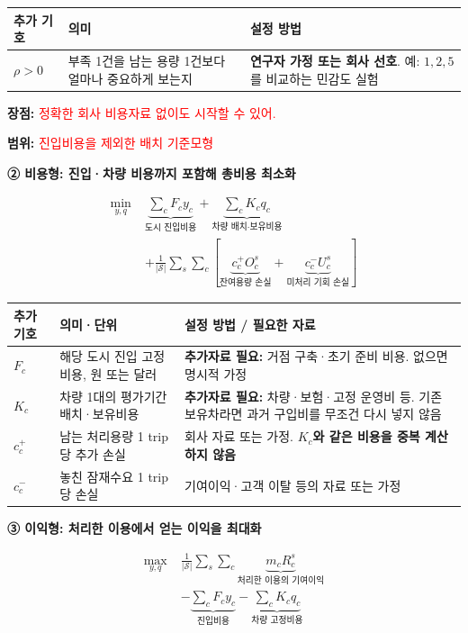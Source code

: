 \documentclass[11pt,a4paper]{article}
\newcommand{\blocktitle}[1]{\par\bigskip\noindent\textbf{\large #1}\par\smallskip}
\begin{document}
\begin{longtable}{@{}P{0.13\textwidth}P{0.38\textwidth}P{0.41\textwidth}@{}}
\toprule
추가 기호 & 의미 & 설정 방법 \\
\midrule
\endhead
$\rho>0$ & 부족 1건을 남는 용량 1건보다 얼마나 중요하게 보는지 & \textbf{연구자 가정 또는 회사 선호}. 예: $1,2,5$를 비교하는 민감도 실험 \\
\bottomrule
\end{longtable}

\textbf{장점:} \textcolor{red}{정확한 회사 비용자료 없이도 시작할 수 있어.}

\textbf{범위:} \textcolor{red}{진입비용을 제외한 배치 기준모형}


\blocktitle{② 비용형: 진입·차량 비용까지 포함해 총비용 최소화}

\[
\boxed{
\begin{aligned}
\min_{y,q}\; &
\underbrace{\sum_c F_cy_c}_{\text{도시 진입비용}}
+
\underbrace{\sum_c K_cq_c}_{\text{차량 배치·보유비용}}\\
&+
\frac{1}{|\mathcal S|}
\sum_s\sum_c
\left[
\underbrace{c_c^+O_c^s}_{\text{잔여용량 손실}}
+
\underbrace{c_c^-U_c^s}_{\text{미처리 기회 손실}}
\right]
\end{aligned}
}
\]

\begin{longtable}{@{}P{0.12\textwidth}P{0.32\textwidth}P{0.48\textwidth}@{}}
\toprule
추가 기호 & 의미·단위 & 설정 방법 / 필요한 자료 \\
\midrule
\endhead
$F_c$ & 해당 도시 진입 고정비용, 원 또는 달러 & \textbf{추가자료 필요:} 거점 구축·초기 준비 비용. 없으면 명시적 가정 \\
$K_c$ & 차량 1대의 평가기간 배치·보유비용 & \textbf{추가자료 필요:} 차량·보험·고정 운영비 등. 기존 보유차라면 과거 구입비를 무조건 다시 넣지 않음 \\
$c_c^+$ & 남는 처리용량 1 trip당 추가 손실 & 회사 자료 또는 가정. \textbf{$K_c$와 같은 비용을 중복 계산하지 않음} \\
$c_c^-$ & 놓친 잠재수요 1 trip당 손실 & 기여이익·고객 이탈 등의 자료 또는 가정 \\
\bottomrule
\end{longtable}

\blocktitle{③ 이익형: 처리한 이용에서 얻는 이익을 최대화}

\[
\boxed{
\begin{aligned}
\max_{y,q}\; &
\frac{1}{|\mathcal S|}
\sum_s\sum_c
\underbrace{m_cR_c^s}_{\text{처리한 이용의 기여이익}}\\
&-
\underbrace{\sum_cF_cy_c}_{\text{진입비용}}
-
\underbrace{\sum_cK_cq_c}_{\text{차량 고정비용}}
\end{aligned}
}
\]
\end{document}
